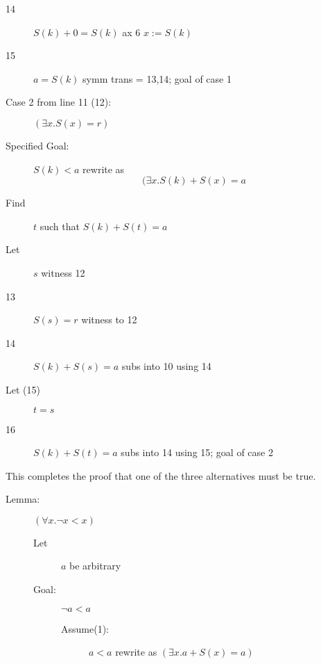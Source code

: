 \documentclass[12pt]{article}
\begin{document}
\begin{description}
\begin{description}
\begin{description}
\begin{description}
\begin{description}
\item[14] $S(k)+0=S(k)$  ax 6 $x:=S(k)$

\item[15]  $a=S(k)$  symm trans = 13,14; goal of case 1

\item[Case 2 from line 11 (12):]  $(\exists x.S(x)=r)$

 \item[Specified Goal:]  $S(k)<a$  rewrite as $$(\exists x.S(k)+S(x)=a$$

\item[Find] $t$ such that $S(k)+S(t)=a$

\item[Let]  $s$ witness 12

\item[13]  $S(s)=r$  witness to 12

\item[14]  $S(k)+S(s)=a$  subs into 10 using 14

\item[Let (15)]  $t=s$

\item[16]  $S(k)+S(t)=a$  subs into 14 using 15; goal of case 2




\end{description}

\end{description}

\end{description}

\end{description}

This completes the proof that one of the three alternatives must be true.

\begin{description}

\item[Lemma:]  $(\forall x.\neg x<x)$

\begin{description}

\item[Let] $a$ be arbitrary

\item[Goal:]  $\neg a<a$

\begin{description}

\item[Assume(1):]  $a<a$  rewrite as $(\exists x.a+S(x)=a)$


\end{description}
\end{description}
\end{description}
\end{description}
\end{document}

